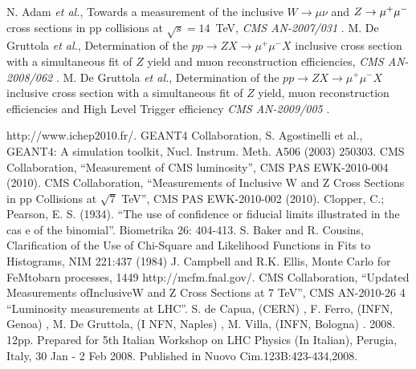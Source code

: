 \documentclass{cmspaper}
\begin{document}
\begin{thebibliography}{9}
   N. Adam {\it et al.}, Towards a measurement of the inclusive $W\rightarrow\mu\nu$ and $Z\rightarrow\mu^+\mu^-$ cross sections in pp collisions at $\sqrt{s} = 14$~TeV, {\em CMS AN-2007/031 }.
 M. De Gruttola {\it et al.}, Determination of the $pp\rightarrow Z X\rightarrow\mu^+\mu^- X$ inclusive cross section with a simultaneous fit of $Z$ yield and muon reconstruction efficiencies, {\em CMS AN-2008/062 }.
 M. De Gruttola {\it et al.}, Determination of the $pp\rightarrow Z X\rightarrow\mu^+\mu^- X$ inclusive cross section with a simultaneous fit of $Z$ yield, muon reconstruction efficiencies and High Level Trigger efficiency {\em CMS AN-2009/005 }.

 http://www.ichep2010.fr/.
 GEANT4 Collaboration, S. Agostinelli et al., GEANT4: A simulation
toolkit, Nucl. Instrum. Meth. A506 (2003) 250303.
 CMS Collaboration, ``Measurement of CMS luminosity'', CMS PAS EWK-2010-004 (2010).
 CMS Collaboration, ``Measurements of Inclusive W and Z Cross Sections in pp Collisions at $\sqrt{7}$  TeV'',
 CMS PAS EWK-2010-002 (2010).
 Clopper, C.; Pearson, E. S. (1934). ``The use of confidence or fiducial limits illustrated in the cas
e of the binomial''. Biometrika 26: 404-413.
 S. Baker and R. Cousins, Clarification of the Use
of Chi-Square and Likelihood Functions in Fits to Histograms, NIM
221:437 (1984)
 J. Campbell and R.K. Ellis, Monte Carlo for FeMtobarn processes,
1449 http://mcfm.fnal.gov/.
  CMS Collaboration, ``Updated Measurements ofInclusiveW and Z Cross Sections at 7 TeV'', CMS AN-2010-26
4
  ``Luminosity measurements at LHC''. S. de Capua, (CERN) , F. Ferro, (INFN, Genoa) , M. De Gruttola, (I
NFN, Naples) , M. Villa, (INFN, Bologna) . 2008. 12pp.
Prepared for 5th Italian Workshop on LHC Physics (In Italian), Perugia, Italy, 30 Jan - 2 Feb 2008.
Published in Nuovo Cim.123B:423-434,2008.


\end{thebibliography}
 

\pagebreak
\end{document}
